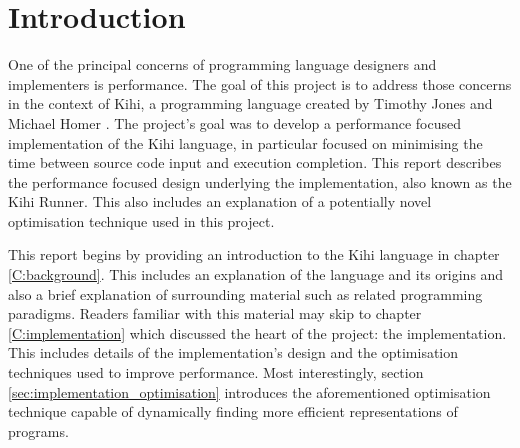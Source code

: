 \chapter{Introduction} \label{C:intro}
One of the principal concerns of programming language designers
and implementers is performance. The goal of this project is to address those concerns in the context of Kihi, a programming language created by Timothy Jones and Michael Homer \cite{jones2018practice}. The project's goal was to develop a performance focused implementation of the Kihi language, in particular focused on minimising the time between source code input and execution completion. This report describes the performance focused design underlying the implementation, also known as the Kihi Runner. This also includes an explanation of a potentially novel optimisation technique used in this project.


This report begins by providing an introduction to the Kihi language in chapter \ref{C:background}. This includes an explanation of the language and its origins and also a brief explanation of surrounding material such as related programming paradigms. Readers familiar with this material may skip to chapter \ref{C:implementation} which discussed the heart of the project: the implementation. This includes details of the implementation's design and the optimisation techniques used to improve performance. Most interestingly, section \ref{sec:implementation_optimisation} introduces the aforementioned optimisation technique capable of dynamically finding more efficient representations of programs.


